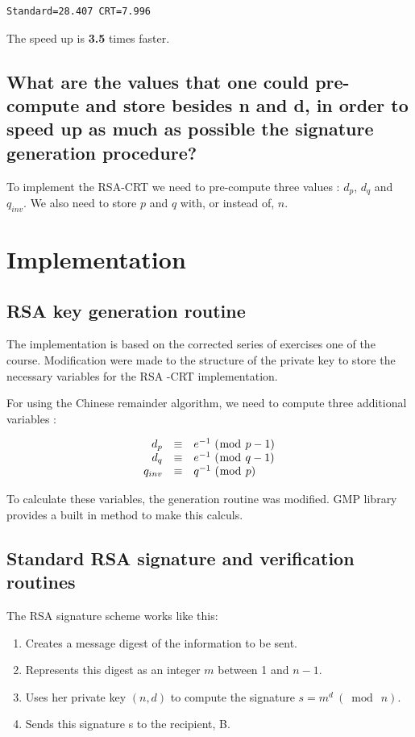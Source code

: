 \documentclass[a4paper]{report}
\begin{document}
\begin{verbatim}
Standard=28.407	CRT=7.996
\end{verbatim}

The speed up is \textbf{3.5} times faster.


\subsection{What are the values that one could pre-compute and store besides n and d, in order to speed up as much as possible the signature generation procedure?}
To implement the RSA-CRT we need to pre-compute three values : $d_p$, $d_q$ and $q_{inv}$. We also need to store $p$ and $q$ with, or instead of, $n$.


\section{Implementation}
\subsection{RSA key generation routine}
The implementation is based on the corrected series of exercises one of the course. Modification were made to the structure of the private key to store the necessary variables for the RSA -CRT implementation.


For using the Chinese remainder algorithm, we need to compute three additional variables :

\[
\left .
   \begin{array}{r c l}
      d_p      & \equiv & e^{-1} \ (\bmod{\ p - 1} ) \\
      d_q      & \equiv & e^{-1} \ (\bmod{\ q - 1} ) \\
      q_{inv} & \equiv & q^{-1} \ ( \bmod{\ p} )
   \end{array}
\right .
\]


To calculate these variables, the generation routine was modified. GMP library provides a built in method to make this calculs. 


\subsection{Standard RSA signature and verification routines}
The RSA signature scheme works like this:
\begin{enumerate}
    \item Creates a message digest of the information to be sent.
    \item Represents this digest as an integer $m$ between 1 and $n-1$.
    \item Uses her private key $(n, d)$ to compute the signature $s = m^d  \ (\bmod{\ n} )$.
    \item Sends this signature s to the recipient, B.
\end{enumerate}
\end{document}
